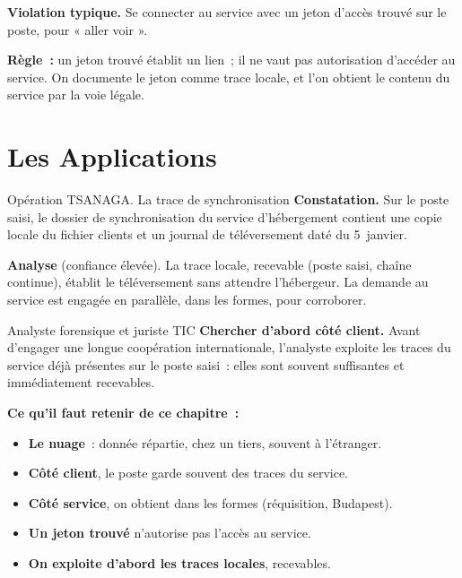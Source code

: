 \begin{boxalert}
\textbf{Violation typique.} Se connecter au service avec un jeton d'accès
trouvé sur le poste, pour « aller voir ».

\smallskip
\textbf{Règle~:} un jeton trouvé établit un lien~; il ne vaut pas autorisation
d'accéder au service. On documente le jeton comme trace locale, et l'on
obtient le contenu du service par la voie légale.
\end{boxalert}

\section{Les Applications}
\label{sec:c15-apps}

\begin{boxscenario}{Opération TSANAGA. La trace de synchronisation}
\textbf{Constatation.} Sur le poste saisi, le dossier de synchronisation du
service d'hébergement contient une copie locale du fichier clients et un
journal de téléversement daté du 5~janvier.

\medskip
\textbf{Analyse} (confiance élevée). La trace locale, recevable (poste saisi,
chaîne continue), établit le téléversement sans attendre l'hébergeur. La
demande au service est engagée en parallèle, dans les formes, pour corroborer.
\end{boxscenario}

\begin{boxmetier}{Analyste forensique et juriste TIC}
\textbf{Chercher d'abord côté client.} Avant d'engager une longue coopération
internationale, l'analyste exploite les traces du service déjà présentes sur
le poste saisi~: elles sont souvent suffisantes et immédiatement recevables.
\end{boxmetier}

\separateur

\begin{boxresume}
\textbf{Ce qu'il faut retenir de ce chapitre~:}
\begin{itemize}
    \item \textbf{Le nuage}~: donnée répartie, chez un tiers, souvent à
          l'étranger.
    \item \textbf{Côté client}, le poste garde souvent des traces du service.
    \item \textbf{Côté service}, on obtient dans les formes (réquisition,
          Budapest).
    \item \textbf{Un jeton trouvé} n'autorise pas l'accès au service.
    \item \textbf{On exploite d'abord les traces locales}, recevables.
\end{itemize}
\end{boxresume}

